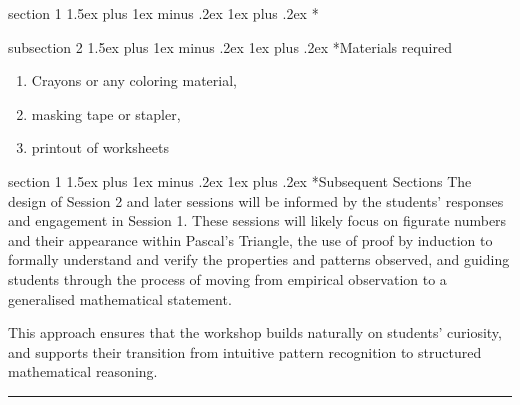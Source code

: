 \documentclass[a4paper,twoside,notitlepage,
11pt,
]{amsart}
\makeatletter
\renewcommand{\section}{\@startsection
  {section}%
  {1}%
  {\z@}%
  {1.5ex plus 1ex minus .2ex}%
  {1ex plus .2ex}%
  {\normalfont\bfseries}}%
\renewcommand{\subsection}{\@startsection
    {subsection}%
    {2}%
    {\z@}%
    {1.5ex plus 1ex minus .2ex}%
    {1ex plus .2ex}%
    {\normalfont\itshape}}%
\makeatother
\begin{document}
\section*{}



\subsection*{Materials required}
\begin{enumerate}
    \item Crayons or any coloring material,
    \item masking tape or stapler,
    \item printout of worksheets
\end{enumerate}
\section*{Subsequent Sections}
The design of Session 2 and later sessions will be informed by the students' responses and engagement in Session 1. These sessions will likely focus on figurate numbers and their appearance within Pascal's Triangle, the use of proof by induction to formally understand and verify the properties and patterns observed, and guiding students through the process of moving from empirical observation to a generalised mathematical statement.

This approach ensures that the workshop builds naturally on students' curiosity, and supports their transition from intuitive pattern recognition to structured mathematical reasoning.
\hrule
\end{document}
